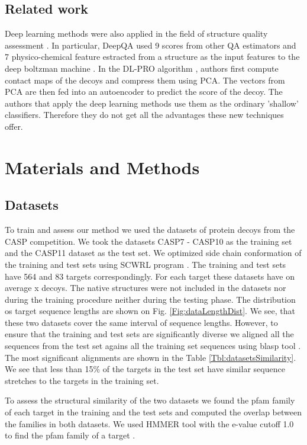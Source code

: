 \documentclass[a4paper,10pt]{article}
\begin{document}
\subsection{Related work}
Deep learning methods were also applied in the field of structure quality assessment \cite{}. In particular, 
DeepQA \cite{} used 9 scores from other QA estimators and 
7 physico-chemical feature estracted from a structure as the input features to the deep boltzman machine \cite{}. 
In the DL-PRO algorithm \cite{}, authors first compute contact maps of the decoys and compress them using PCA. 
The vectors from PCA are then fed into an autoencoder to predict the score of the decoy. 
The authors that apply the deep learning methods use them as the ordinary 'shallow' classifiers. 
Therefore they do not get all the advantages these new techniques offer.


\section{Materials and Methods}




\subsection{Datasets}
To train and assess our method we used the datasets of protein decoys from the CASP competition. 
We took the datasets CASP7 - CASP10 as the training set and the CASP11 dataset as the test set.
We optimized side chain conformation of the training and test sets using SCWRL program \cite{}.
The training and test sets have 564 and 83 targets correspondingly. For each target these datasets have 
on average x decoys. The native structures were not included in the datasets nor during the training procedure
neither during the testing phase. The distribution os target sequence lengths are shown on Fig. \ref{Fig:dataLengthDist}. We see,
that these two datasets cover the same interval of sequence lengths. However, to ensure that the training 
and test sets are significantly diverse we aligned all the sequences from the test set agains all the training 
set sequences using blasp tool \cite{}. The most significant alignments are shown in the Table \ref{Tbl:datasetsSimilarity}.
We see that less than 15\% of the targets in the test set have similar sequence stretches to the targets in the training set.

To assess the structural similarity of the two datasets we found the pfam family of each target in the training and the 
test sets and computed the overlap between the families in both datasets. We used HMMER tool with the e-value cutoff 1.0 to 
find the pfam family of a target \cite{}.
\end{document}
